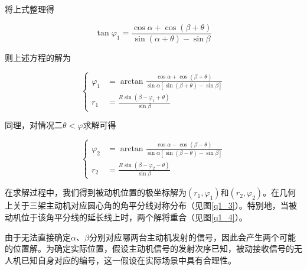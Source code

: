 \documentclass[withoutpreface,bwprint]{cumcmthesis} %
\begin{document}
将上式整理得

\begin{equation}
    \tan\varphi_1= \frac{\cos\alpha + \cos(\beta +\theta)}{\sin(\alpha+\theta)- \sin\beta}
\end{equation}

则上述方程的解为

\begin{equation}
    \left\{
        \begin{aligned}
            \varphi_1 &= \arctan \frac{\cos\alpha+\cos(\beta+\theta)}{\sin\alpha[\sin(\beta+\theta)-\sin\beta]} \\
            r_1 &= \frac{R \sin(\beta-\varphi_1+\theta)}{\sin\beta}
        \end{aligned}
    \right.
    \label{解1}
\end{equation}

同理，对情况二$\theta<\varphi$求解可得

\begin{equation}
    \left\{
        \begin{aligned}
            \varphi_2 &= \arctan \frac{\cos\alpha-\cos(\beta-\theta)}{\sin\alpha[\sin(\beta-\theta)-\sin\beta]} \\
            r_2 &= \frac{R \sin(\beta-\varphi_2-\theta)}{\sin\beta}
        \end{aligned}
    \right.
\end{equation}

在求解过程中，我们得到被动机位置的极坐标解为\((r_1,\varphi_1)\)和\((r_2,\varphi_2)\)。在几何上关于三架主动机对应圆心角的角平分线对称分布（见图\ref{q1_3}）。特别地，当被动机位于该角平分线的延长线上时，两个解将重合（见图\ref{q1_4}）。




由于无法直接确定\(\alpha\)、\(\beta\)分别对应哪两台主动机发射的信号，因此会产生两个可能的位置解。为确定实际位置，假设主动机信号的发射次序已知，被动接收信号的无人机已知自身对应的编号，这一假设在实际场景中具有合理性。
\end{document}
